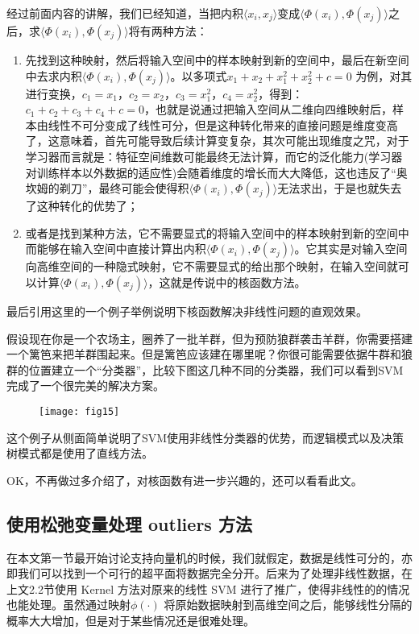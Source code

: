 \documentclass[a4paper,12pt]{article}
\begin{document}
 经过前面内容的讲解，我们已经知道，当把内积$\langle x_i,x_j\rangle$变成$\langle\Phi(x_i),\Phi(x_j)\rangle$之后，求$\langle\Phi(x_i),\Phi(x_j)\rangle$将有两种方法：
 \begin{enumerate}[1.~]
   \item 先找到这种映射，然后将输入空间中的样本映射到新的空间中，最后在新空间中去求内积$\langle\Phi(x_i),\Phi(x_j)\rangle$。以多项式$x_1+x_2+x_1^2+x_2^2+c=0$ 为例，对其进行变换，$c_1=x_1$，$c_2=x_2$，$c_3=x_1^2$，$c_4=x_2^2$，得到：$c_1+c_2+c_3+c_4+c=0$，也就是说通过把输入空间从二维向四维映射后，样本由线性不可分变成了线性可分，但是这种转化带来的直接问题是维度变高了，这意味着，首先可能导致后续计算变复杂，其次可能出现维度之咒，对于学习器而言就是：特征空间维数可能最终无法计算，而它的泛化能力(学习器对训练样本以外数据的适应性)会随着维度的增长而大大降低，这也违反了“奥坎姆的剃刀”，最终可能会使得积$\langle\Phi(x_i),\Phi(x_j)\rangle$无法求出，于是也就失去了这种转化的优势了；
   \item 或者是找到某种方法，它不需要显式的将输入空间中的样本映射到新的空间中而能够在输入空间中直接计算出内积$\langle\Phi(x_i),\Phi(x_j)\rangle$。它其实是对输入空间向高维空间的一种隐式映射，它不需要显式的给出那个映射，在输入空间就可以计算$\langle\Phi(x_i),\Phi(x_j)\rangle$，这就是传说中的核函数方法。
\end{enumerate}

最后引用这里的一个例子举例说明下核函数解决非线性问题的直观效果。

假设现在你是一个农场主，圈养了一批羊群，但为预防狼群袭击羊群，你需要搭建一个篱笆来把羊群围起来。但是篱笆应该建在哪里呢？你很可能需要依据牛群和狼群的位置建立一个“分类器”，比较下图这几种不同的分类器，我们可以看到SVM完成了一个很完美的解决方案。

\begin{figure}[H]
  \centering
  \texttt{[image: fig15]}
\end{figure}

这个例子从侧面简单说明了SVM使用非线性分类器的优势，而逻辑模式以及决策树模式都是使用了直线方法。

OK，不再做过多介绍了，对核函数有进一步兴趣的，还可以看看此文。

\subsection{使用松弛变量处理 outliers 方法}
在本文第一节最开始讨论支持向量机的时候，我们就假定，数据是线性可分的，亦即我们可以找到一个可行的超平面将数据完全分开。后来为了处理非线性数据，在上文2.2节使用 Kernel 方法对原来的线性 SVM 进行了推广，使得非线性的的情况也能处理。虽然通过映射$\phi(\cdot)$  将原始数据映射到高维空间之后，能够线性分隔的概率大大增加，但是对于某些情况还是很难处理。
\end{document}

